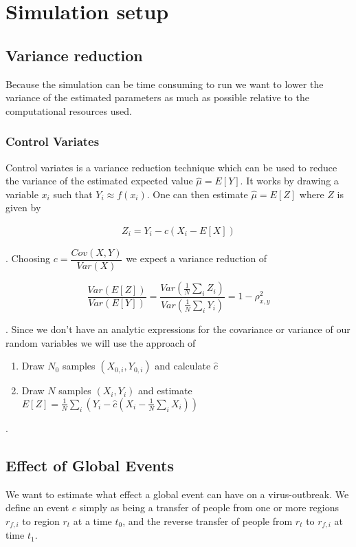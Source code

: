 \section{Simulation setup}
\subsection{Variance reduction}
Because the simulation can be time consuming to run we want to lower the variance of the estimated parameters as much as possible relative to the computational resources used. 

\subsubsection{Control Variates}
Control variates is a variance reduction technique which can be used to reduce the variance of the estimated expected value $\hat{\mu} =E[Y]$. It works by drawing a variable $x_i$ such that $Y_i \approx f(x_i)$. One can then estimate $\hat{\mu} =E[Z]$ where $Z$ is given by

\begin{align}
Z_i = Y_i - c (X_i - E[X]) 
\end{align}

. Choosing $c = \dfrac{Cov(X, Y)}{Var(X)}$ we expect a variance reduction of

\begin{equation}
\frac{Var(E[Z])}{Var(E[Y])} = \frac{ Var(\frac{1}{N} \sum_i Z_i) }{ Var(\frac{1}{N} \sum_i Y_i )} = 1 - \rho_{x, y}^2
\end{equation}

. Since we don't have an analytic expressions for the covariance or variance of our random variables we will use the approach of

\begin{enumerate}
	\item Draw $N_0$ samples $(X_{0,i}, Y_{0, i})$ and calculate $\hat{c}$
	\item Draw $N$ samples $(X_i, Y_i)$ and estimate $E[Z] = \frac{1}{N} \sum_i \left( Y_i - \hat{c} (X_i - \frac{1}{N}\sum_i X_i) \right)  $
\end{enumerate}

.

\subsection{Effect of Global Events}
We want to estimate what effect a global event can have on a virus-outbreak. We define an event $e$ simply as being a transfer of people from one or more regions $r_{f, i}$ to region $r_t$ at a time $t_0$, and the reverse transfer of people from $r_t$ to $r_{f, i}$ at time $t_1$.


